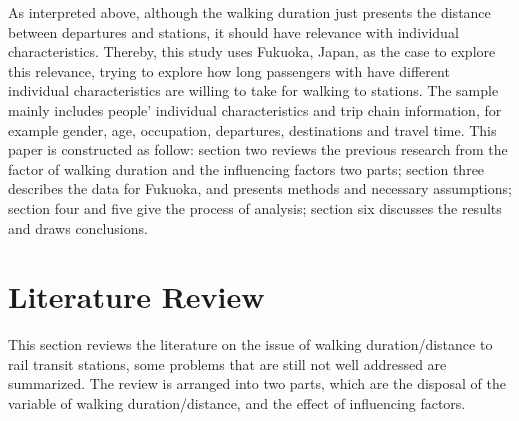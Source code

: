 %
As interpreted above, although the walking duration just presents the distance between departures and stations, it should have relevance with individual characteristics. Thereby, this study uses Fukuoka, Japan, as the case to explore this relevance, trying to explore how long passengers with have different individual characteristics are willing to take for walking to stations. The sample mainly includes people' individual characteristics and trip chain information, for example gender, age, occupation, departures, destinations and travel time. This paper is constructed as follow: section two reviews the previous research from the factor of walking duration and the influencing factors two parts;  section three describes the data for Fukuoka, and presents methods and necessary assumptions; section four and five give the process of analysis; section six discusses the results and draws conclusions. 

%
\section{Literature Review}
This section reviews the literature on the issue of walking duration/distance to rail transit stations, some problems that are still not well addressed are summarized. The review is arranged into two parts, which are the disposal of the variable of walking duration/distance, and the effect of influencing factors.

